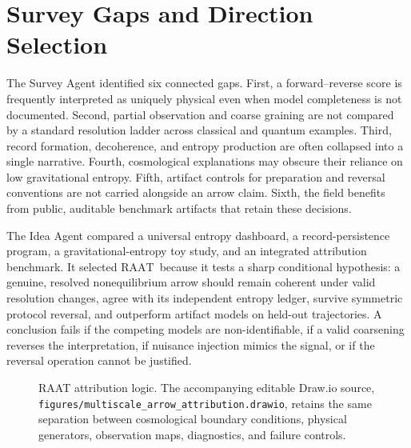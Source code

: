 \documentclass[conference]{../../../../Conference-LaTeX-template_10-17-19/IEEEtran}
\newcommand{\RAAT}{\ensuremath{\mathrm{RAAT}}}
\begin{document}
\section{Survey Gaps and Direction Selection}

The Survey Agent identified six connected gaps. First, a forward--reverse score is frequently interpreted as uniquely physical even when model completeness is not documented. Second, partial observation and coarse graining are not compared by a standard resolution ladder across classical and quantum examples. Third, record formation, decoherence, and entropy production are often collapsed into a single narrative. Fourth, cosmological explanations may obscure their reliance on low gravitational entropy. Fifth, artifact controls for preparation and reversal conventions are not carried alongside an arrow claim. Sixth, the field benefits from public, auditable benchmark artifacts that retain these decisions.

The Idea Agent compared a universal entropy dashboard, a record-persistence program, a gravitational-entropy toy study, and an integrated attribution benchmark. It selected \RAAT\ because it tests a sharp conditional hypothesis: a genuine, resolved nonequilibrium arrow should remain coherent under valid resolution changes, agree with its independent entropy ledger, survive symmetric protocol reversal, and outperform artifact models on held-out trajectories. A conclusion fails if the competing models are non-identifiable, if a valid coarsening reverses the interpretation, if nuisance injection mimics the signal, or if the reversal operation cannot be justified.

\begin{figure}[!t]
\centering
{}
\caption{RAAT attribution logic. The accompanying editable Draw.io source, \texttt{figures/multiscale\_arrow\_attribution.drawio}, retains the same separation between cosmological boundary conditions, physical generators, observation maps, diagnostics, and failure controls.}
\label{fig:raat_flow}
\end{figure}


\end{document}
